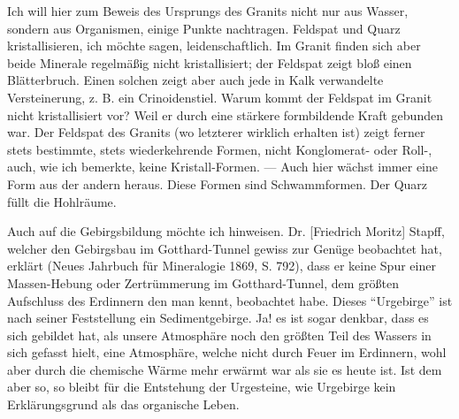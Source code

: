 \documentclass[a4paper, 12pt, oneside]{article}
\begin{document}
Ich will hier zum Beweis des Ursprungs des Granits nicht nur aus Wasser, sondern aus Organismen, einige Punkte nachtragen. Feldspat und Quarz kristallisieren, ich möchte sagen, leidenschaftlich. Im Granit finden sich aber beide Minerale regelmäßig nicht kristallisiert; der Feldspat zeigt bloß einen Blätterbruch. Einen solchen zeigt aber auch jede in Kalk verwandelte Versteinerung, z. B. ein Crinoidenstiel. Warum kommt der Feldspat im Granit nicht kristallisiert vor? Weil er durch eine stärkere formbildende Kraft gebunden war. Der Feldspat des Granits (wo letzterer wirklich erhalten ist) zeigt ferner stets bestimmte, stets wiederkehrende Formen, nicht Konglomerat- oder Roll-, auch, wie ich bemerkte, keine Kristall-Formen. — Auch hier wächst immer eine Form aus der andern heraus. Diese Formen sind Schwammformen. Der Quarz füllt die Hohlräume.

Auch auf die Gebirgsbildung möchte ich hinweisen. Dr. [Friedrich Moritz] Stapff, welcher den Gebirgsbau im Gotthard-Tunnel gewiss zur Genüge beobachtet hat, erklärt (Neues Jahrbuch für Mineralogie 1869, S. 792), dass er keine Spur einer Massen-Hebung oder Zertrümmerung im Gotthard-Tunnel, dem größten Aufschluss des Erdinnern den man kennt, beobachtet habe. Dieses "`Urgebirge"' ist nach seiner Feststellung ein Sedimentgebirge. Ja! es ist sogar denkbar, dass es sich gebildet hat, als unsere Atmosphäre noch den größten Teil des Wassers in sich gefasst hielt, eine Atmosphäre, welche nicht durch Feuer im Erdinnern, wohl aber durch die chemische Wärme mehr erwärmt war als sie es heute ist. Ist dem aber so, so bleibt für die Entstehung der Urgesteine, wie Urgebirge kein Erklärungsgrund als das organische Leben.
\end{document}
